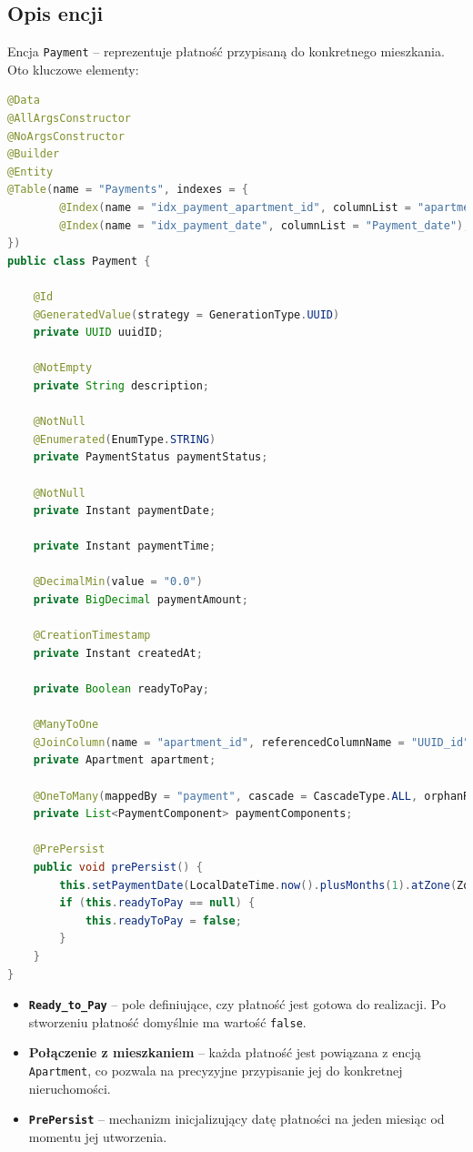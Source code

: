 \subsection{Opis encji}

Encja \texttt{Payment} -- reprezentuje płatność przypisaną do konkretnego mieszkania. Oto kluczowe elementy:

\begin{lstlisting}[language=Java, caption=Kod encji \texttt{Payment}]
@Data
@AllArgsConstructor
@NoArgsConstructor
@Builder
@Entity
@Table(name = "Payments", indexes = {
        @Index(name = "idx_payment_apartment_id", columnList = "apartment_id"),
        @Index(name = "idx_payment_date", columnList = "Payment_date"),
})
public class Payment {

    @Id
    @GeneratedValue(strategy = GenerationType.UUID)
    private UUID uuidID;

    @NotEmpty
    private String description;

    @NotNull
    @Enumerated(EnumType.STRING)
    private PaymentStatus paymentStatus;

    @NotNull
    private Instant paymentDate;

    private Instant paymentTime;

    @DecimalMin(value = "0.0")
    private BigDecimal paymentAmount;

    @CreationTimestamp
    private Instant createdAt;

    private Boolean readyToPay;

    @ManyToOne
    @JoinColumn(name = "apartment_id", referencedColumnName = "UUID_id")
    private Apartment apartment;

    @OneToMany(mappedBy = "payment", cascade = CascadeType.ALL, orphanRemoval = true)
    private List<PaymentComponent> paymentComponents;

    @PrePersist
    public void prePersist() {
        this.setPaymentDate(LocalDateTime.now().plusMonths(1).atZone(ZoneId.systemDefault()).toInstant());
        if (this.readyToPay == null) {
            this.readyToPay = false;
        }
    }
}
\end{lstlisting}

\begin{itemize}
    \item \textbf{\texttt{Ready\_to\_Pay}} -- pole definiujące, czy płatność jest gotowa do realizacji. Po stworzeniu płatność domyślnie ma wartość \texttt{false}.
    \item \textbf{Połączenie z mieszkaniem} -- każda płatność jest powiązana z encją \texttt{Apartment}, co pozwala na precyzyjne przypisanie jej do konkretnej nieruchomości.
    \item \textbf{\texttt{PrePersist}} -- mechanizm inicjalizujący datę płatności na jeden miesiąc od momentu jej utworzenia.
\end{itemize}

